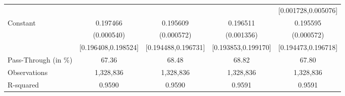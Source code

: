 {\begin{tabular}{l*{4}{c}}
                    &                     &                     &                     &[0.001728,0.005076]         \\
Constant            &    0.197466\sym{***}&    0.195609\sym{***}&    0.196511\sym{***}&    0.195595\sym{***}\\
                    &  (0.000540)         &  (0.000572)         &  (0.001356)         &  (0.000572)         \\
                    &[0.196408,0.198524]         &[0.194488,0.196731]         &[0.193853,0.199170]         &[0.194473,0.196718]         \\
\midrule
Pass-Through (in \%)&       67.36         &       68.48         &       68.82         &       67.80         \\
Observations        &   1,328,836         &   1,328,836         &   1,328,836         &   1,328,836         \\
R-squared           &      0.9590         &      0.9590         &      0.9591         &      0.9591         \\
\bottomrule
\end{tabular}
}
